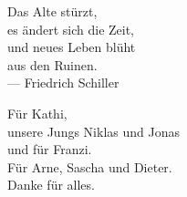 
\thispagestyle{empty}


\vspace*{3cm}

\begin{center}
Das Alte stürzt, \\
es ändert sich die Zeit,\\
und neues Leben blüht \\
aus den Ruinen. \\ \medskip
--- Friedrich Schiller
\end{center}

\medskip

\begin{center}
  Für Kathi, \\
  unsere Jungs Niklas und Jonas \\
  und für Franzi. \\
  Für Arne, Sascha und Dieter. \\ 
  \medskip Danke für alles.
\end{center}
